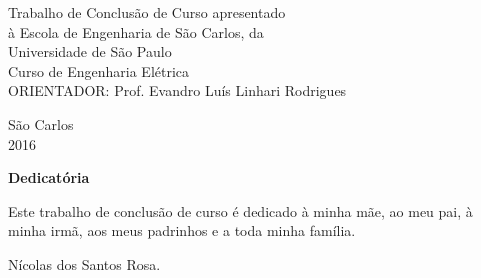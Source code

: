 		\large
		{
			\begin{flushright}
			\Large{Trabalho de Conclusão de Curso apresentado} \hspace{1cm}\\
			\Large{à Escola de Engenharia de São Carlos, da}\\
			\Large{Universidade de São Paulo}\\
			\vspace{0.05\textheight}
			\Large{Curso de Engenharia Elétrica}\\
			\vspace{0.05\textheight}
			\Large{ORIENTADOR: Prof. Evandro Luís Linhari Rodrigues}\\
			\end{flushright}
	
			\begin{center}
				\vspace{0.15\textheight}
				\Large{São Carlos}\\
				\Large{2016}
			\end{center}
		}



\newpage




\newpage




\cleardoublepage
\vspace{0.11\textheight} 
\begin{center}
\textbf{\Huge{Dedicatória}}
\end{center}
\vspace{0.05\textheight}

Este trabalho de conclusão de curso é dedicado à minha mãe, ao meu pai, à minha irmã, aos meus padrinhos e a toda minha família.

\begin{flushright}
Nícolas dos Santos Rosa.
\end{flushright}

